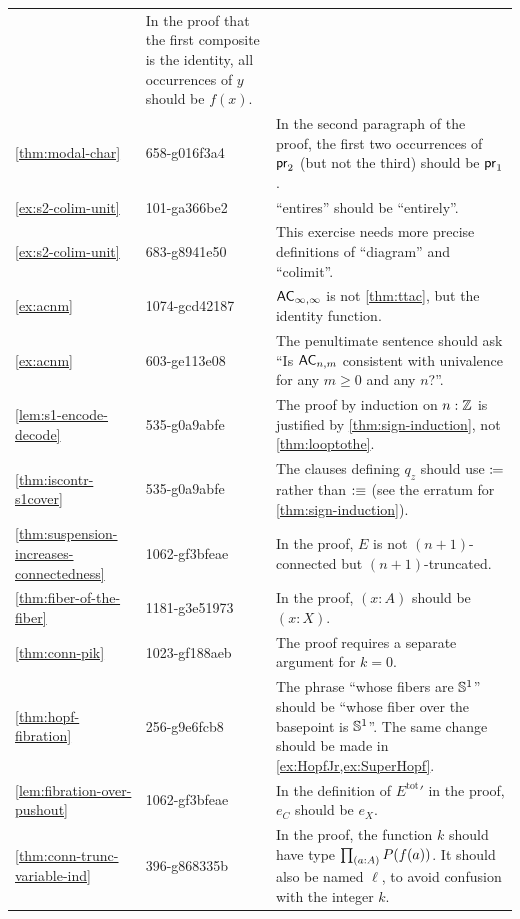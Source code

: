 \documentclass[
%
%
11pt %
]{article}
\begin{document}
\begin{longtable}{llp{10.5cm}}
  & In the proof that the first composite is the identity, all occurrences of $y$ should be $f(x)$.\\
  \cref{thm:modal-char}
  & 658-g016f3a4
  & In the second paragraph of the proof, the first two occurrences of $\mathsf{pr}_{2}$ (but not the third) should be $\mathsf{pr}_{1}$.\\
  \cref{ex:s2-colim-unit}
  & 101-ga366be2
  & ``entires'' should be ``entirely''.\\
  \cref{ex:s2-colim-unit}
  & 683-g8941e50
  & This exercise needs more precise definitions of ``diagram'' and ``colimit''.\\
  \cref{ex:acnm}
  & 1074-gcd42187
  & $\mathsf{AC}_{\infty,\infty}$ is not \cref{thm:ttac}, but the identity function.\\
  \cref{ex:acnm}
  & 603-ge113e08
  & The penultimate sentence should ask ``Is $\mathsf{AC}_{n,m}$ consistent with univalence for any $m\ge 0$ and any $n$?''.\\
  \cref{lem:s1-encode-decode}
  & 535-g0a9abfe
  & The proof by induction on $n:\mathbb{Z}$ is justified by \cref{thm:sign-induction}, not \cref{thm:looptothe}.\\
  \cref{thm:iscontr-s1cover}
  & 535-g0a9abfe
  & The clauses defining $q_z$ should use $\coloneqq$ rather than $\vcentcolon\equiv$ (see the erratum for \cref{thm:sign-induction}).\\
  \cref{thm:suspension-increases-connectedness}
  & 1062-gf3bfeae
  & In the proof, $E$ is not $(n + 1)$-connected but $(n + 1)$-truncated.\\
  \cref{thm:fiber-of-the-fiber}
  & 1181-g3e51973
  & In the proof, $(x:A)$ should be $(x:X)$.\\
  \cref{thm:conn-pik}
  & 1023-gf188aeb
  & The proof requires a separate argument for $k=0$.\\
  \cref{thm:hopf-fibration}
  & 256-g9e6fcb8
  & The phrase ``whose fibers are $\mathbb{S}^1$'' should be ``whose fiber over the basepoint is $\mathbb{S} ^1$''.
  The same change should be made in \cref{ex:HopfJr,ex:SuperHopf}.\\
  \cref{lem:fibration-over-pushout}
  & 1062-gf3bfeae
  & In the definition of ${E^{\mathrm{tot}}}'$ in the proof, $e_C$ should be $e_X$.\\
  \cref{thm:conn-trunc-variable-ind}
  & 396-g868335b
  & In the proof, the function $k$ should have type $\prd{a:A} P(f(a))$.
  It should also be named $\ell$, to avoid confusion with the integer $k$.\\

\end{longtable}
\end{document}

